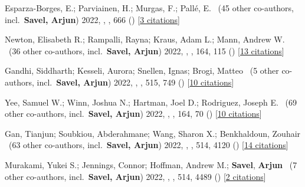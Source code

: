 \item[{\color{numcolor}\scriptsize16}] Esparza-Borges, E.; Parviainen, H.; Murgas, F.; Pall{\'e}, E. \etal\ ({45} other co-authors, incl.\ \textbf{Savel, Arjun}) 2022, , \aanda, {666} () [\href{https://ui.adsabs.harvard.edu/abs/2022A&A...666A..10E}{3 citations}]

\item[{\color{numcolor}\scriptsize15}] Newton, Elisabeth R.; Rampalli, Rayna; Kraus, Adam L.; Mann, Andrew W. \etal\ ({36} other co-authors, incl.\ \textbf{Savel, Arjun}) 2022, , \aj, {164}, 115 () [\href{https://ui.adsabs.harvard.edu/abs/2022AJ....164..115N}{13 citations}]

\item[{\color{numcolor}\scriptsize14}] Gandhi, Siddharth; Kesseli, Aurora; Snellen, Ignas; Brogi, Matteo \etal\ ({5} other co-authors, incl.\ \textbf{Savel, Arjun}) 2022, , \mnras, {515}, 749 () [\href{https://ui.adsabs.harvard.edu/abs/2022MNRAS.515..749G}{10 citations}]

\item[{\color{numcolor}\scriptsize13}] Yee, Samuel W.; Winn, Joshua N.; Hartman, Joel D.; Rodriguez, Joseph E. \etal\ ({69} other co-authors, incl.\ \textbf{Savel, Arjun}) 2022, , \aj, {164}, 70 () [\href{https://ui.adsabs.harvard.edu/abs/2022AJ....164...70Y}{10 citations}]

\item[{\color{numcolor}\scriptsize12}] Gan, Tianjun; Soubkiou, Abderahmane; Wang, Sharon X.; Benkhaldoun, Zouhair \etal\ ({63} other co-authors, incl.\ \textbf{Savel, Arjun}) 2022, , \mnras, {514}, 4120 () [\href{https://ui.adsabs.harvard.edu/abs/2022MNRAS.514.4120G}{14 citations}]

\item[{\color{numcolor}\scriptsize11}] Murakami, Yukei S.; Jennings, Connor; Hoffman, Andrew M.; \textbf{Savel}, \textbf{Arjun} \etal\ ({7} other co-authors, incl.\ \textbf{Savel, Arjun}) 2022, , \mnras, {514}, 4489 () [\href{https://ui.adsabs.harvard.edu/abs/2022MNRAS.514.4489M}{2 citations}]

